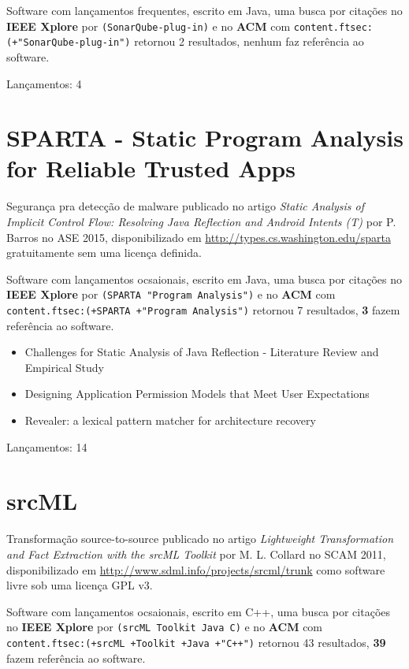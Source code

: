 Software com lançamentos frequentes,
escrito em Java,
uma busca por citações no {\bf IEEE Xplore} por
\texttt{(SonarQube-plug-in)}
e no {\bf ACM} com
\texttt{content.ftsec:(+"SonarQube-plug-in")}
retornou
2 resultados,
nenhum faz referência ao software.


Lançamentos: 4

\section{SPARTA - Static Program Analysis for Reliable Trusted Apps}

Segurança pra detecção de malware
publicado no artigo {\it Static Analysis of Implicit Control Flow: Resolving Java Reflection and Android Intents (T)}
por P. Barros
no ASE 2015,
disponibilizado em \url{http://types.cs.washington.edu/sparta}
gratuitamente
sem uma licença definida.

Software com lançamentos ocsaionais,
escrito em Java,
uma busca por citações no {\bf IEEE Xplore} por
\texttt{(SPARTA "Program Analysis")}
e no {\bf ACM} com
\texttt{content.ftsec:(+SPARTA +"Program Analysis")}
retornou
7 resultados,
{\bf 3} fazem referência ao software.

\begin{itemize}
\item Challenges for Static Analysis of Java Reflection - Literature Review and Empirical Study
\item Designing Application Permission Models that Meet User Expectations
\item Revealer: a lexical pattern matcher for architecture recovery
\end{itemize}

Lançamentos: 14

\section{srcML}

Transformação source-to-source
publicado no artigo {\it Lightweight Transformation and Fact Extraction with the srcML Toolkit}
por M. L. Collard
no SCAM 2011,
disponibilizado em \url{http://www.sdml.info/projects/srcml/trunk}
como software livre
sob uma licença GPL v3.

Software com lançamentos ocsaionais,
escrito em C++,
uma busca por citações no {\bf IEEE Xplore} por
\texttt{(srcML Toolkit Java C)}
e no {\bf ACM} com
\texttt{content.ftsec:(+srcML +Toolkit +Java +"C++")}
retornou
43 resultados,
{\bf 39} fazem referência ao software.

